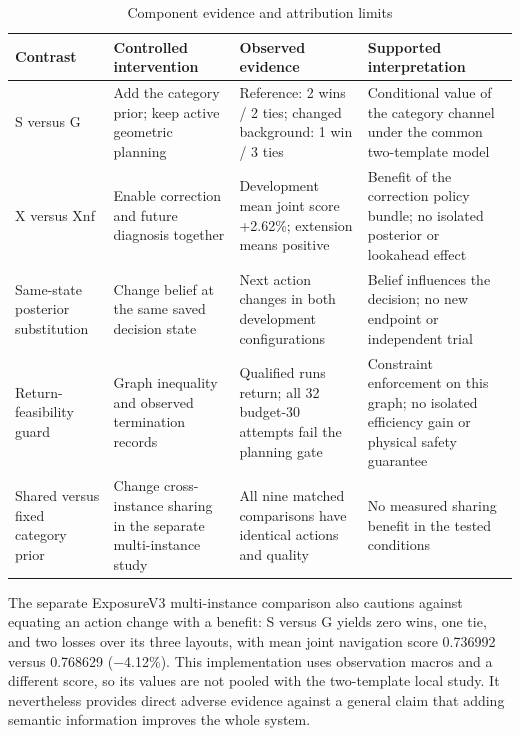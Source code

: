 \documentclass[11pt,a4paper]{article}
\newlength{\JournalTableWidth}
\begin{document}
\begin{table}[!htbp]
\caption{Component evidence and attribution limits}\label{tab:6}
\small\renewcommand{\arraystretch}{1.12}\setlength{\tabcolsep}{3pt}
\setlength{\JournalTableWidth}{\dimexpr\linewidth-6\tabcolsep\relax}
\begin{tabular}{@{}>{\raggedright\arraybackslash}p{0.22\JournalTableWidth} >{\raggedright\arraybackslash}p{0.24\JournalTableWidth} >{\raggedright\arraybackslash}p{0.24\JournalTableWidth} >{\raggedright\arraybackslash}p{0.3\JournalTableWidth}@{}}
\toprule
Contrast & Controlled intervention & Observed evidence & Supported interpretation \\
\midrule
S versus G & Add the category prior; keep active geometric planning & Reference: 2 wins / 2 ties; changed background: 1 win / 3 ties & Conditional value of the category channel under the common two-template model \\
X versus Xnf & Enable correction and future diagnosis together & Development mean joint score +2.62\%; extension means positive & Benefit of the correction policy bundle; no isolated posterior or lookahead effect \\
Same-state posterior substitution & Change belief at the same saved decision state & Next action changes in both development configurations & Belief influences the decision; no new endpoint or independent trial \\
Return-feasibility guard & Graph inequality and observed termination records & Qualified runs return; all 32 budget-30 attempts fail the planning gate & Constraint enforcement on this graph; no isolated efficiency gain or physical safety guarantee \\
Shared versus fixed category prior & Change cross-instance sharing in the separate multi-instance study & All nine matched comparisons have identical actions and quality & No measured sharing benefit in the tested conditions \\
\bottomrule
\end{tabular}
\end{table}

The separate ExposureV3 multi-instance comparison also cautions against equating an action change with a benefit: S versus G yields zero wins, one tie, and two losses over its three layouts, with mean joint navigation score 0.736992 versus 0.768629 (\ensuremath{-}4.12\%). This implementation uses observation macros and a different score, so its values are not pooled with the two-template local study. It nevertheless provides direct adverse evidence against a general claim that adding semantic information improves the whole system.
\end{document}
